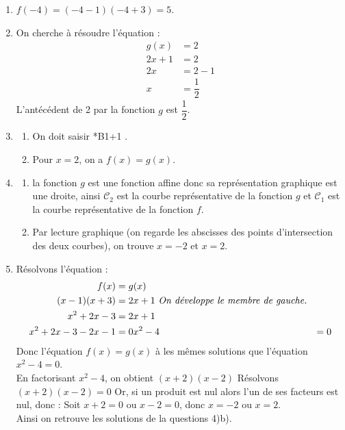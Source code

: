 
\medskip
\begin{enumerate}
	\item $f(-4)=(-4-1)(-4+3)=5$.
	\item On cherche à résoudre l'équation :
	\begin{align*}
	g(x)&=2\\
	2x+1&=2\\
	2x&=2-1\\
	x&=\dfrac{1}{2}
	\end{align*}
	L'antécédent de 2 par la fonction $g$ est $\dfrac{1}{2}$.
	\item \begin{enumerate}
				\item On doit saisir *B1+1 \fg{}.
				\item Pour $x=2$, on a $f(x)=g(x)$.
			\end{enumerate}
	\item \begin{enumerate}
				\item la fonction $g$ est une fonction affine donc sa représentation graphique est une droite, ainsi $\mathcal{C}_2$ est la courbe représentative de la fonction $g$ et $\mathcal{C}_1$ est la courbe représentative de la fonction $f$.
				\item Par lecture graphique (on regarde les abscisses des points d'intersection des deux courbes), on trouve $x=-2$ et $x=2$.
			\end{enumerate}
	\item Résolvons l'équation :
	\begin{align*}
	f(x)&=g(x)\\
	(x-1)(x+3)&=2x+1 \text{ \textit{On développe le membre de gauche.}}\\
	x^2+2x-3&=2x+1\\
	x^2+2x-3-2x-1&=0
	x^2-4&=0 
	\end{align*}
	Donc l'équation $f(x)=g(x)$ à les mêmes solutions que l'équation $x^2-4=0$.\\
	
	En factorisant $x^2-4$, on obtient $(x+2)(x-2)$	
	Résolvons $(x+2)(x-2)=0$
	Or, si un produit est nul alors l'un de ses facteurs est nul, donc :
	Soit $x+2=0$ ou $x-2=0$, donc
	$x=-2$ ou $x=2$.\\
	Ainsi on retrouve les solutions de la questions 4)b).
\end{enumerate}


\bigskip

